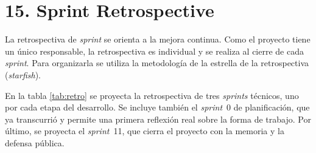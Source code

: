 \documentclass[
11pt, %
codirector, %
]{charter}
\begin{document}
\section{15. Sprint Retrospective}
\label{sec:sprint_retro}

La retrospectiva de \textit{sprint} se orienta a la mejora continua. Como el proyecto tiene un único responsable, la retrospectiva es individual y se realiza al cierre de cada \textit{sprint}. Para organizarla se utiliza la metodología de la estrella de la retrospectiva (\textit{starfish}).

En la tabla \ref{tab:retro} se proyecta la retrospectiva de tres \textit{sprints} técnicos, uno por cada etapa del desarrollo. Se incluye también el \textit{sprint}~0 de planificación, que ya transcurrió y permite una primera reflexión real sobre la forma de trabajo. Por último, se proyecta el \textit{sprint}~11, que cierra el proyecto con la memoria y la defensa pública.
\end{document}
